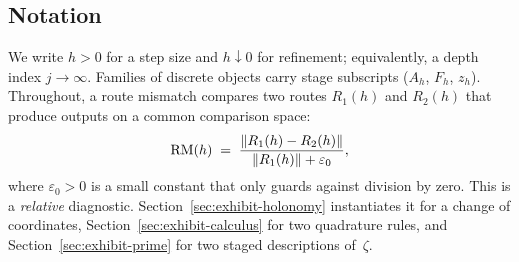 \subsection{Notation}
We write $h>0$ for a step size and $h\downarrow 0$ for refinement; equivalently, a depth index $j\to\infty$.
Families of discrete objects carry stage subscripts ($A_h$, $F_h$, $z_h$).
Throughout, a route mismatch compares two routes $R_1(h)$ and $R_2(h)$ that produce outputs on a common comparison space:
\begin{equation}\label{eq:rm-generic}
  \mathrm{RM}(h)\;=\;\frac{\|R_1(h)-R_2(h)\|}{\|R_1(h)\|+\varepsilon_0},
\end{equation}
where $\varepsilon_0>0$ is a small constant that only guards against division by zero.
This is a \emph{relative} diagnostic.
Section~\ref{sec:exhibit-holonomy} instantiates it for a change of coordinates, Section~\ref{sec:exhibit-calculus} for two quadrature rules, and Section~\ref{sec:exhibit-prime} for two staged descriptions of~$\zeta$.
